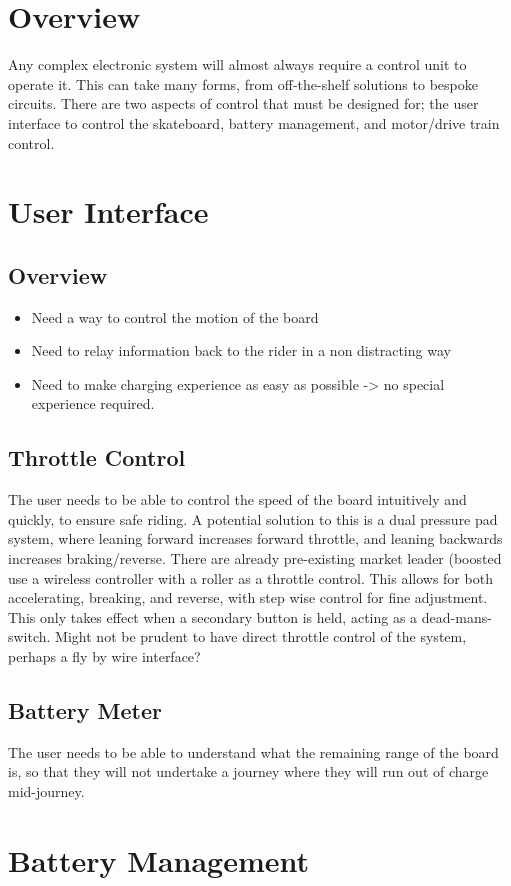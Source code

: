 \documentclass[journal,10pt]{IEEEtran}
\begin{document}
\section{Overview}
	Any complex electronic system will almost always require a control unit to operate it. This can take many forms, from off-the-shelf solutions to bespoke circuits.
	There are two aspects of control that must be designed for; the user interface to control the skateboard, battery management, and motor/drive train control.
\section{User Interface}
	\subsection{Overview}
		\begin{itemize}
			\item Need a way to control the motion of the board
			\item Need to relay information back to the rider in a non distracting way
			\item Need to make charging experience as easy as possible -> no special experience required.
		\end{itemize}
	\subsection{Throttle Control}
		The user needs to be able to control the speed of the board intuitively and quickly, to ensure safe riding.
		A potential solution to this is a dual pressure pad system, where leaning forward increases forward throttle, and leaning backwards increases braking/reverse.
		There are already pre-existing market leader (boosted use a wireless controller with a roller as a throttle control. 
		This allows for both accelerating, breaking, and reverse, with step wise control for fine adjustment.
		This only takes effect when a secondary button is held, acting as a dead-mans-switch.
		Might not be prudent to have direct throttle control of the system, perhaps a fly by wire interface?
	\subsection{Battery Meter}
		The user needs to be able to understand what the remaining range of the board is, so that they will not undertake a journey where they will run out of charge mid-journey.
\section{Battery Management}
\end{document}
